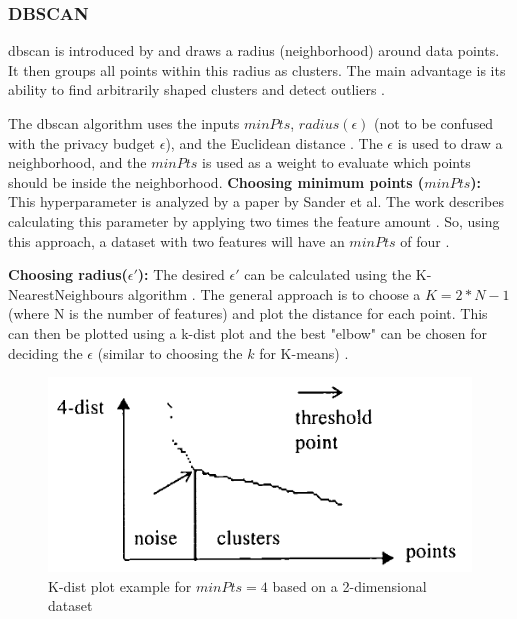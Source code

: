 \subsubsection{DBSCAN} \label{theory:clustering-dbscan}
\gls{dbscan} is introduced by \citep{ester_density-based_nodate} and draws a radius (neighborhood) around data points.
It then groups all points within this radius as clusters. The main advantage is its ability to find arbitrarily shaped clusters and detect outliers \citep{liu_privacy_2012}.

The \gls{dbscan} algorithm uses the inputs $minPts$, $radius(\epsilon)$ (not to be confused with the privacy budget $\epsilon$), and the Euclidean distance \citep{schubert_dbscan_2017}.
The $\epsilon$ is used to draw a neighborhood, and the $minPts$ is used as a weight to evaluate which points should be inside the neighborhood.
\textbf{Choosing minimum points ($minPts$):} This hyperparameter is analyzed by a paper by Sander et al.
The work describes calculating this parameter by applying two times the feature amount \citep{sander_density-based_1998}.
So, using this approach, a dataset with two features will have an $minPts$ of four \citep{schubert_dbscan_2017}.
\newpage

\textbf{Choosing radius($\epsilon'$):} The desired $\epsilon'$ can be calculated using the K-NearestNeighbours algorithm \citep{ester_density-based_nodate,schubert_dbscan_2017}.
The general approach is to choose a $K = 2*N - 1$ (where N is the number of features) and plot the distance for each point.
This can then be plotted using a k-dist plot and the best "elbow" can be chosen for deciding the $\epsilon$ (similar to choosing the $k$ for K-means) \citep{elbatta_dynamic_2013}.
\begin{figure}[H]
  \includegraphics{TheorethicalFramework/K-dist-elbow.png}
  \caption{K-dist plot example for $minPts = 4$ based on a 2-dimensional dataset \citep{ester_density-based_nodate}}
  \label{k-dist-plot}
\end{figure}

